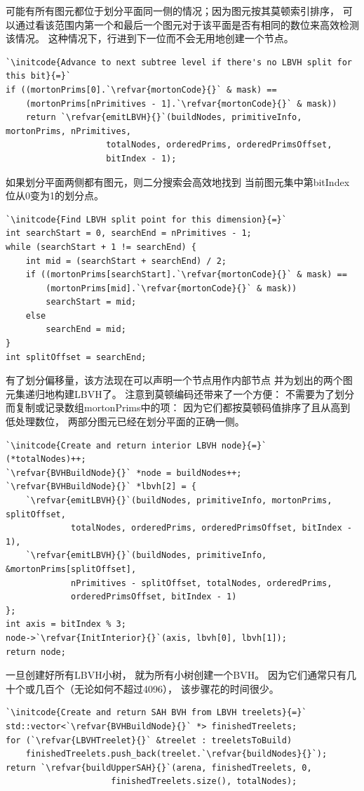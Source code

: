 可能有所有图元都位于划分平面同一侧的情况；因为图元按其莫顿索引排序，
可以通过看该范围内第一个和最后一个图元对于该平面是否有相同的数位来高效检测该情况。
这种情况下，行进到下一位而不会无用地创建一个节点。
\begin{lstlisting}
`\initcode{Advance to next subtree level if there's no LBVH split for this bit}{=}`
if ((mortonPrims[0].`\refvar{mortonCode}{}` & mask) ==
    (mortonPrims[nPrimitives - 1].`\refvar{mortonCode}{}` & mask))
    return `\refvar{emitLBVH}{}`(buildNodes, primitiveInfo, mortonPrims, nPrimitives,
                    totalNodes, orderedPrims, orderedPrimsOffset,
                    bitIndex - 1);
\end{lstlisting}

如果划分平面两侧都有图元，则二分搜索会高效地找到
当前图元集中第{\ttfamily bitIndex}位从0变为1的划分点。
\begin{lstlisting}
`\initcode{Find LBVH split point for this dimension}{=}`
int searchStart = 0, searchEnd = nPrimitives - 1;
while (searchStart + 1 != searchEnd) {
    int mid = (searchStart + searchEnd) / 2;
    if ((mortonPrims[searchStart].`\refvar{mortonCode}{}` & mask) ==
        (mortonPrims[mid].`\refvar{mortonCode}{}` & mask))
        searchStart = mid;
    else
        searchEnd = mid;
}
int splitOffset = searchEnd;
\end{lstlisting}

有了划分偏移量，该方法现在可以声明一个节点用作内部节点
并为划出的两个图元集递归地构建LBVH了。
注意到莫顿编码还带来了一个方便：
不需要为了划分而复制或记录数组{\ttfamily mortonPrims}中的项：
因为它们都按莫顿码值排序了且从高到低处理数位，
两部分图元已经在划分平面的正确一侧。
\begin{lstlisting}
`\initcode{Create and return interior LBVH node}{=}`
(*totalNodes)++;
`\refvar{BVHBuildNode}{}` *node = buildNodes++;
`\refvar{BVHBuildNode}{}` *lbvh[2] = {
    `\refvar{emitLBVH}{}`(buildNodes, primitiveInfo, mortonPrims, splitOffset,
             totalNodes, orderedPrims, orderedPrimsOffset, bitIndex - 1),
    `\refvar{emitLBVH}{}`(buildNodes, primitiveInfo, &mortonPrims[splitOffset],
             nPrimitives - splitOffset, totalNodes, orderedPrims,
             orderedPrimsOffset, bitIndex - 1)
};
int axis = bitIndex % 3;
node->`\refvar{InitInterior}{}`(axis, lbvh[0], lbvh[1]);
return node;
\end{lstlisting}

一旦创建好所有LBVH小树，
就为所有小树创建一个BVH。
因为它们通常只有几十个或几百个（无论如何不超过4096），
该步骤花的时间很少。
\begin{lstlisting}
`\initcode{Create and return SAH BVH from LBVH treelets}{=}`
std::vector<`\refvar{BVHBuildNode}{}` *> finishedTreelets;
for (`\refvar{LBVHTreelet}{}` &treelet : treeletsToBuild)
    finishedTreelets.push_back(treelet.`\refvar{buildNodes}{}`);
return `\refvar{buildUpperSAH}{}`(arena, finishedTreelets, 0,
                     finishedTreelets.size(), totalNodes);
\end{lstlisting}

